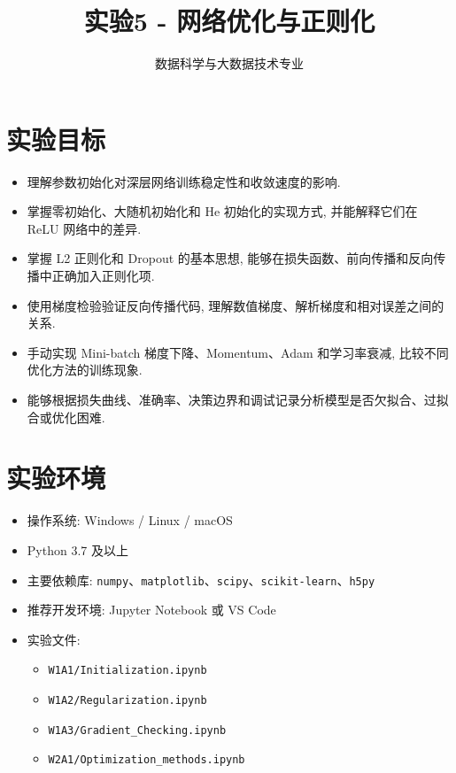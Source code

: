 \documentclass{../../nndlcourse}
\begin{document}
\title{实验5 - 网络优化与正则化}
\author{数据科学与大数据技术专业}
\date{}
\maketitle


\section{实验目标}
\begin{itemize}
    \item 理解参数初始化对深层网络训练稳定性和收敛速度的影响.
    \item 掌握零初始化、大随机初始化和 He 初始化的实现方式, 并能解释它们在 ReLU 网络中的差异.
    \item 掌握 L2 正则化和 Dropout 的基本思想, 能够在损失函数、前向传播和反向传播中正确加入正则化项.
    \item 使用梯度检验验证反向传播代码, 理解数值梯度、解析梯度和相对误差之间的关系.
    \item 手动实现 Mini-batch 梯度下降、Momentum、Adam 和学习率衰减, 比较不同优化方法的训练现象.
    \item 能够根据损失曲线、准确率、决策边界和调试记录分析模型是否欠拟合、过拟合或优化困难.
\end{itemize}


\section{实验环境}
\begin{itemize}
    \item 操作系统: Windows / Linux / macOS
    \item Python 3.7 及以上
    \item 主要依赖库: \texttt{numpy}、\texttt{matplotlib}、\texttt{scipy}、\texttt{scikit-learn}、\texttt{h5py}
    \item 推荐开发环境: Jupyter Notebook 或 VS Code
    \item 实验文件:
    \begin{itemize}
        \item \texttt{W1A1/Initialization.ipynb}
        \item \texttt{W1A2/Regularization.ipynb}
        \item \texttt{W1A3/Gradient\_Checking.ipynb}
        \item \texttt{W2A1/Optimization\_methods.ipynb}
    \end{itemize}
\end{itemize}
\end{document}
